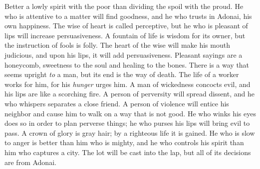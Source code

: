 \begin{biblechapter}
\verse Better a lowly spirit with the poor 
than dividing the spoil with the proud.
\verse He who is attentive to a matter will find goodness, 
and he who trusts in Adonai, his own happiness.
\verse The wise of heart is called perceptive, 
but he who is pleasant of lips will increase persuasiveness.
\verse A fountain of life is wisdom for its owner, 
but the instruction of fools is folly.
\verse The heart of the wise will make his mouth judicious, 
and upon his lips, it will add persuasiveness.
\verse Pleasant sayings are a honeycomb, 
sweetness to the soul and healing to the bones.
\verse There is a way that seems upright \textit{to} a man, 
but its end is the way of death.
\verse The life of a worker works for him, 
for his \textit{hunger} urges him.
\verse A man of wickedness concocts evil, 
and his lips are like a scorching fire.
\verse A person of perversity will spread dissent, 
and he who whispers separates a close friend.
\verse A person of violence will entice his neighbor 
and cause him to walk on a way that is not good.
\verse He who winks his eyes does so in order to plan perverse things; 
he who purses his lips will bring evil to pass.
\verse A crown of glory is gray hair; 
by a righteous life it is gained.
\verse He who is slow to anger is better than him who is mighty, 
and he who controls his spirit than him who captures a city.
\verse The lot will be cast into the lap, 
but all of its decisions are from Adonai.
\end{biblechapter}

